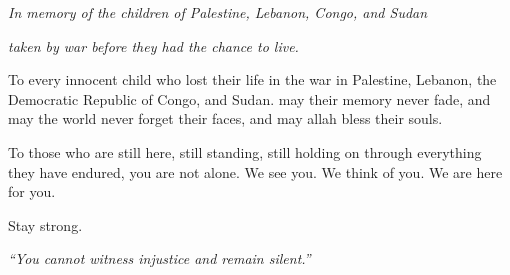 
\clearpage
\thispagestyle{empty}

\vspace*{3cm}

\begin{center}

  {\large \textit{In memory of the children of Palestine, Lebanon, Congo, and Sudan}}

  \vspace{0.6cm}

  {\large \textit{taken by war before they had the chance to live.}}

  \vspace{2cm}

  \begin{minipage}{0.8\textwidth}
    \centering
    {\normalsize
    To every innocent child who lost their life in the war
    in Palestine, Lebanon, the Democratic Republic of Congo, and Sudan.
    may their memory never fade,
    and may the world never forget their faces,
    and may allah bless their souls.

    \vspace{1cm}

    To those who are still here, still standing, still holding on
    through everything they have endured,
    you are not alone.
    We see you. We think of you. We are here for you.

    \vspace{1cm}

    Stay strong.
    }
  \end{minipage}

  \vspace{3cm}

  {\small \textit{``You cannot witness injustice and remain silent.''}}

\end{center}

\clearpage
